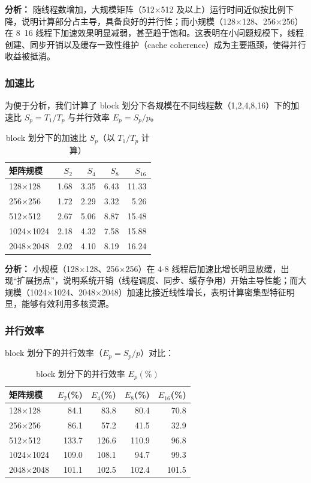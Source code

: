 \documentclass{SYSUReport}
\begin{document}
\textbf{分析：} 随线程数增加，大规模矩阵（512×512 及以上）运行时间近似按比例下降，说明计算部分占主导，具备良好的并行性；而小规模（128×128、256×256）在 8~16 线程下加速效果明显减弱，甚至趋于饱和。这表明在小问题规模下，线程创建、同步开销以及缓存一致性维护（cache coherence）成为主要瓶颈，使得并行收益被抵消。

\subsubsection{加速比}
为便于分析，我们计算了 block 划分下各规模在不同线程数（1,2,4,8,16）下的加速比 $S_p=T_1/T_p$ 与并行效率 $E_p=S_p/p$。
\begin{table}[H]
\centering
\caption{block 划分下的加速比 $S_p$（以 $T_1/T_p$ 计算）}
\begin{tabular}{lrrrr}
\toprule
矩阵规模 & $S_2$ & $S_4$ & $S_8$ & $S_{16}$ \\
\midrule
128×128  & 1.68 & 3.35 & 6.43 & 11.33 \\
256×256  & 1.72 & 2.29 & 3.32 & 5.26 \\
512×512  & 2.67 & 5.06 & 8.87 & 15.48 \\
1024×1024 & 2.18 & 4.32 & 7.58 & 15.88 \\
2048×2048 & 2.02 & 4.10 & 8.19 & 16.24 \\
\bottomrule
\end{tabular}
\end{table}

\textbf{分析：} 小规模（128×128、256×256）在 4-8 线程后加速比增长明显放缓，出现“扩展拐点”，说明系统开销（线程调度、同步、缓存争用）开始主导性能；而大规模（1024×1024、2048×2048）加速比接近线性增长，表明计算密集型特征明显，能够有效利用多核资源。

\subsubsection{并行效率}

block 划分下的并行效率（$E_p=S_p/p$）对比：

\begin{table}[H]
\centering
\caption{block 划分下的并行效率 $E_p(\%)$}
\begin{tabular}{lrrrr}
\toprule
矩阵规模 & $E_2$(\%) & $E_4$(\%) & $E_8$(\%) & $E_{16}$(\%) \\
\midrule
128×128  & 84.1 & 83.8 & 80.4 & 70.8 \\
256×256  & 86.1 & 57.2 & 41.5 & 32.9 \\
512×512  & 133.7 & 126.6 & 110.9 & 96.8 \\
1024×1024 & 109.0 & 108.1 & 94.7 & 99.3 \\
2048×2048 & 101.1 & 102.5 & 102.4 & 101.5 \\
\bottomrule
\end{tabular}
\end{table}
\end{document}
